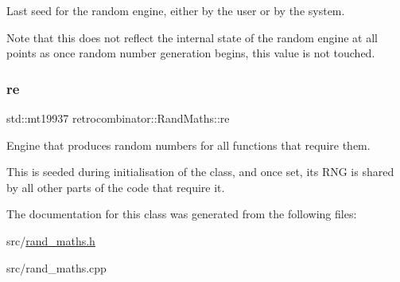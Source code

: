Last seed for the random engine, either by the user or by the system. 

Note that this does not reflect the internal state of the random engine at all points as once random number generation begins, this value is not touched. \mbox{\label{classretrocombinator_1_1RandMaths_a8455f3a94efd124edd0ecfc806744476}} 
\subsubsection{\texorpdfstring{re}{re}}
{\footnotesize\ttfamily std\+::mt19937 retrocombinator\+::\+Rand\+Maths\+::re\hspace{0.3cm}{\ttfamily [private]}}



Engine that produces random numbers for all functions that require them. 

This is seeded during initialisation of the class, and once set, its R\+NG is shared by all other parts of the code that require it. 

The documentation for this class was generated from the following files\+:\begin{DoxyCompactItemize}
\item 
src/\hyperlink{rand__maths_8h}{rand\+\_\+maths.\+h}\item 
src/rand\+\_\+maths.\+cpp\end{DoxyCompactItemize}
